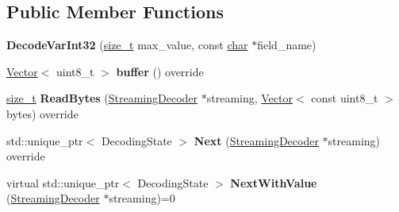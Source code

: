 \subsection*{Public Member Functions}
\begin{DoxyCompactItemize}
\item 
\mbox{\label{classv8_1_1internal_1_1wasm_1_1StreamingDecoder_1_1DecodeVarInt32_a47900a58835b11f700629a9460c64f0a}} 
{\bfseries Decode\+Var\+Int32} (\mbox{\hyperlink{classsize__t}{size\+\_\+t}} max\+\_\+value, const \mbox{\hyperlink{classchar}{char}} $\ast$field\+\_\+name)
\item 
\mbox{\label{classv8_1_1internal_1_1wasm_1_1StreamingDecoder_1_1DecodeVarInt32_ae0db38c0f8f057492fd50bd86f908d65}} 
\mbox{\hyperlink{classv8_1_1internal_1_1Vector}{Vector}}$<$ uint8\+\_\+t $>$ {\bfseries buffer} () override
\item 
\mbox{\label{classv8_1_1internal_1_1wasm_1_1StreamingDecoder_1_1DecodeVarInt32_a6106bbb967e813f512712b0e235aa747}} 
\mbox{\hyperlink{classsize__t}{size\+\_\+t}} {\bfseries Read\+Bytes} (\mbox{\hyperlink{classv8_1_1internal_1_1wasm_1_1StreamingDecoder}{Streaming\+Decoder}} $\ast$streaming, \mbox{\hyperlink{classv8_1_1internal_1_1Vector}{Vector}}$<$ const uint8\+\_\+t $>$ bytes) override
\item 
\mbox{\label{classv8_1_1internal_1_1wasm_1_1StreamingDecoder_1_1DecodeVarInt32_afc4b6f17fdf737c0fb2e6b02cb522960}} 
std\+::unique\+\_\+ptr$<$ Decoding\+State $>$ {\bfseries Next} (\mbox{\hyperlink{classv8_1_1internal_1_1wasm_1_1StreamingDecoder}{Streaming\+Decoder}} $\ast$streaming) override
\item 
\mbox{\label{classv8_1_1internal_1_1wasm_1_1StreamingDecoder_1_1DecodeVarInt32_ac499e45dc3c025aabd2b7f7c574bbf94}} 
virtual std\+::unique\+\_\+ptr$<$ Decoding\+State $>$ {\bfseries Next\+With\+Value} (\mbox{\hyperlink{classv8_1_1internal_1_1wasm_1_1StreamingDecoder}{Streaming\+Decoder}} $\ast$streaming)=0
\end{DoxyCompactItemize}
